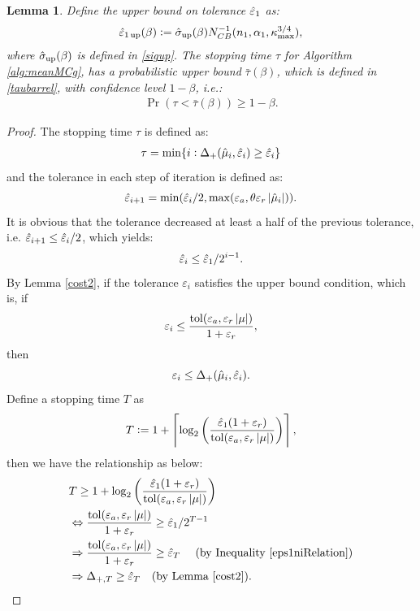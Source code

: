 \documentclass{iitthesis}
\newtheorem{lemma}[theorem]{Lemma}
\theoremstyle{definition}
\begin{document}
\begin{lemma}\label{tauprobbound}
Define the upper bound on tolerance $\hat{\varepsilon}_1$ as:
\begin{align}\label{eps1updef}
\hat{\varepsilon}_{1\operatorname{up}}(\beta):=\hat{\sigma}_{\operatorname{up}}(\beta) N_{CB}^{-1}(n_1,\alpha_1,\kappa_{\max}^{3/4}),
\end{align}
where $\hat{\sigma}_{\operatorname{up}}(\beta)$ is defined in \eqref{sigup}. The stopping time $\tau$ for Algorithm \ref{alg:meanMCg}, has a probabilistic upper bound $\bar{\tau}(\beta)$, which is defined in \eqref{taubarrel}, with confidence level $1-\beta$, i.e.:
\begin{align}
\Pr(\tau <\bar{\tau}(\beta)) \geq 1-\beta.
\end{align}
\end{lemma}
\begin{proof}
The stopping time $\tau$ is defined as:
 \begin{align}\label{st}
\tau = \min \{ i: \Delta_{+}(\hat{\mu}_i, \hat{\varepsilon}_i) \geq \hat{\varepsilon}_i \}
\end{align}
 and the tolerance in each step of iteration is defined as:
 $$\hat{\varepsilon}_{i+1} = \min(\hat{\varepsilon}_i/2, \max(\varepsilon_a,\theta\varepsilon_r\left \lvert \hat{\mu}_i \right \rvert)).$$ 
 It is obvious that the tolerance decreased at least a half of the previous tolerance, i.e.
$\hat{\varepsilon}_{i+1} \leq\hat{\varepsilon}_i/2$, which yields: 
\begin{align}\label{eps1niRelation}
\hat{\varepsilon}_i \le\hat{\varepsilon}_1/2^{i-1}.
\end{align} 
By Lemma \ref{cost2}, if the tolerance $\varepsilon_i$ satisfies the upper bound condition, which is, if $$\varepsilon_i \leq \frac{\operatorname{tol}(\varepsilon_a, \varepsilon_r\left \lvert \mu \right \rvert)}{1+\varepsilon_r},$$ then
$$\varepsilon_i \leq \Delta_{+}(\hat{\mu}_i, \hat{\varepsilon}_i).$$ 
Define a stopping time $T$ as
$$T := 1+\left \lceil \log_{2} \left(\frac{\hat{\varepsilon}_{1}(1+\varepsilon_r)}{ \operatorname{tol}(\varepsilon_a,\varepsilon_r \left \lvert \mu \right \rvert)}\right) \right \rceil, $$
then we have the relationship as below:
\begin{align}
& T \geq 1+\log_{2} \left(\frac{\heps_{1}(1+\varepsilon_r)}{ \tol(\varepsilon_a,\varepsilon_r \abs{\mu})}\right)\\&
\Leftrightarrow  \frac{\tol(\varepsilon_a, \varepsilon_r\abs{\mu})}{1+\varepsilon_r} \ge \heps_1/2^{T-1}\\
& \Rightarrow \frac{\tol(\varepsilon_a, \varepsilon_r\abs{\mu})}{1+\varepsilon_r} \ge \heps_T  \text{ \quad (by Inequality \eqref{eps1niRelation}})\\&
\Rightarrow \Delta_{+, T} \ge \heps_{T} \text{\quad(by Lemma \ref{cost2})}.

\end{align}
\end{proof}
\end{document}
